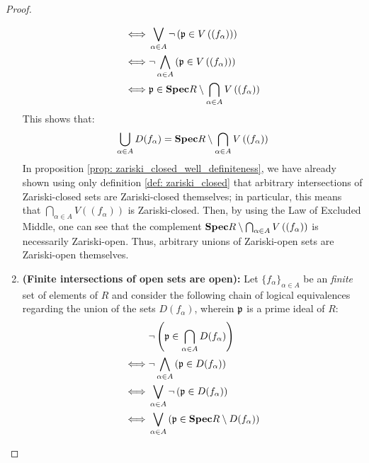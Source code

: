 \begin{proof}
\begin{enumerate}
$$\begin{aligned}
                                            \iff & \bigvee_{\alpha \in A} \neg \left(\p \in V\left((f_{\alpha})\right)\right)
                                            \\
                                            \iff & \neg \bigwedge_{\alpha \in A} \left(\p \in V\left((f_{\alpha})\right)\right)
                                            \\
                                            \iff & \p \in \Spec R \setminus \bigcap_{\alpha \in A} V\left((f_{\alpha})\right)
                                        \end{aligned}
                                    $$
                                This shows that:
                                    $$\bigcup_{\alpha \in A} D(f_{\alpha}) = \Spec R \setminus \bigcap_{\alpha \in A} V\left((f_{\alpha})\right)$$
                                In proposition \ref{prop: zariski_closed_well_definiteness}, we have already shown using only definition \ref{def: zariski_closed} that arbitrary intersections of Zariski-closed sets are Zariski-closed themselves; in particular, this means that $\bigcap_{\alpha \in A} V\left((f_{\alpha})\right)$ is Zariski-closed. Then, by using the Law of Excluded Middle, one can see that the complement $\Spec R \setminus \bigcap_{\alpha \in A} V\left((f_{\alpha})\right)$ is necessarily Zariski-open. Thus, arbitrary unions of Zariski-open sets are Zariski-open themselves.
                                \item \textbf{(Finite intersections of open sets are open):} Let $\{f_{\alpha}\}_{\alpha \in A}$ be an \textit{finite} set of elements of $R$ and consider the following chain of logical equivalences regarding the union of the sets $D(f_{\alpha})$, wherein $\p$ is a prime ideal of $R$:
                                    $$
                                        \begin{aligned}
                                            & \neg \left(\p \in \bigcap_{\alpha \in A} D(f_{\alpha})\right)
                                            \\
                                            \iff & \neg \bigwedge_{\alpha \in A} \left(\p \in D(f_{\alpha})\right)
                                            \\
                                            \iff & \bigvee_{\alpha \in A} \neg \left(\p \in D(f_{\alpha})\right)
                                            \\
                                            \iff & \bigvee_{\alpha \in A} \left(\p \in \Spec R \setminus D(f_{\alpha})\right)

\end{aligned}$$
\end{enumerate}
\end{proof}
